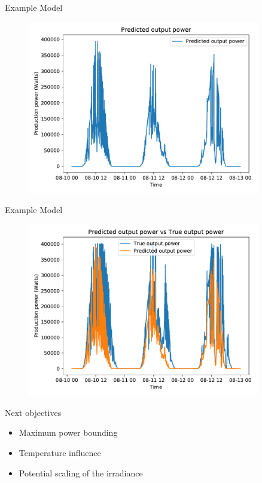 \documentclass[12pt]{beamer}
\begin{document}
\begin{frame}{Example Model}
    \begin{figure}
        \centering
        \includegraphics[width=0.9\textwidth]{resources/pdf/predicted_power.pdf}
    \end{figure}
\end{frame}

\begin{frame}{Example Model}
    \begin{figure}
        \centering
        \includegraphics[width=0.9\textwidth]{resources/pdf/predicted_vs_true.pdf}
    \end{figure}
\end{frame}

\begin{frame}{Next objectives}
    \begin{itemize}
        \item Maximum power \alert{bounding}
        \item \alert{Temperature} influence
        \item Potential \alert{scaling} of the irradiance
    \end{itemize}
\end{frame}
\end{document}
